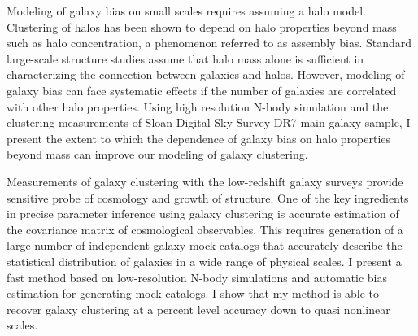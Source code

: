 Modeling of galaxy bias on small scales requires assuming a halo model. Clustering of halos has been shown to depend on halo properties beyond mass such as halo concentration, a phenomenon referred to as assembly bias. Standard large-scale structure studies assume that halo mass alone is sufficient in characterizing the connection between galaxies and halos. However, modeling of galaxy bias can face systematic effects if the number of galaxies are correlated with other halo properties. Using high resolution N-body simulation and the clustering measurements of Sloan Digital Sky Survey DR7 main galaxy sample, I present the extent to which the dependence of galaxy bias on halo properties beyond mass can improve our modeling of galaxy clustering.

Measurements of galaxy clustering with the low-redshift galaxy surveys provide sensitive probe of cosmology and growth of structure. One of the key ingredients in precise parameter inference using galaxy clustering is accurate estimation of the covariance matrix of cosmological observables. This requires generation of a large number of independent galaxy mock catalogs that accurately describe the statistical distribution of galaxies in a wide range of physical scales. I present a fast method based on low-resolution N-body simulations and automatic bias estimation for generating mock catalogs. 
I show that my method is able to recover galaxy clustering at a percent level accuracy down to quasi nonlinear scales. 

